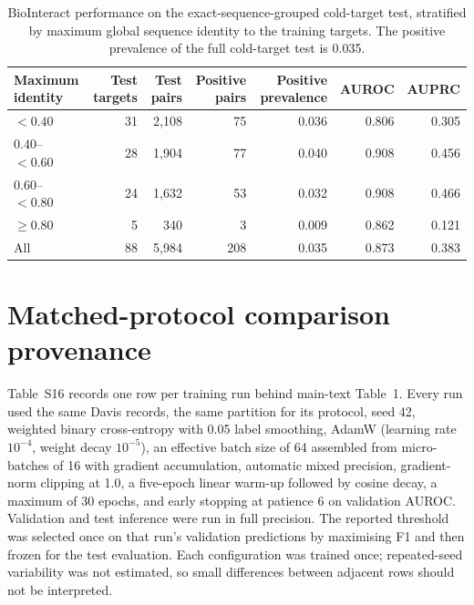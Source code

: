 \documentclass[11pt]{article}
\begin{document}
\begin{table}[H]
\centering
\small
\caption{BioInteract performance on the exact-sequence-grouped cold-target test,
stratified by maximum global sequence identity to the training targets. The
positive prevalence of the full cold-target test is 0.035.}
\begin{tabular}{lrrrrrr}
\toprule
Maximum identity & Test targets & Test pairs & Positive pairs &
Positive prevalence & AUROC & AUPRC \\
\midrule
$<0.40$         & 31 & 2{,}108 & 75 & 0.036 & 0.806 & 0.305 \\
$0.40$--$<0.60$ & 28 & 1{,}904 & 77 & 0.040 & 0.908 & 0.456 \\
$0.60$--$<0.80$ & 24 & 1{,}632 & 53 & 0.032 & 0.908 & 0.466 \\
$\geq 0.80$     &  5 &    340 &  3 & 0.009 & 0.862 & 0.121 \\
\midrule
All             & 88 & 5{,}984 & 208 & 0.035 & 0.873 & 0.383 \\
\bottomrule
\end{tabular}
\label{tab:identity_bins_si}
\end{table}

\clearpage
\section*{Matched-protocol comparison provenance}

Table~S16 records one row per training run behind main-text Table~1. Every run
used the same Davis records, the same partition for its protocol, seed 42,
weighted binary cross-entropy with 0.05 label smoothing, AdamW (learning rate
$10^{-4}$, weight decay $10^{-5}$), an effective batch size of 64 assembled from
micro-batches of 16 with gradient accumulation, automatic mixed precision,
gradient-norm clipping at 1.0, a five-epoch linear warm-up followed by cosine
decay, a maximum of 30 epochs, and early stopping at patience 6 on validation
AUROC. Validation and test inference were run in full precision. The reported
threshold was selected once on that run's validation predictions by maximising
F1 and then frozen for the test evaluation. Each configuration was trained once;
repeated-seed variability was not estimated, so small differences between
adjacent rows should not be interpreted.
\end{document}
